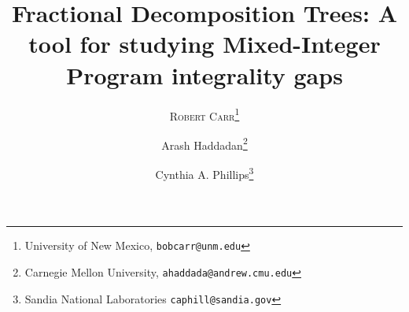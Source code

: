 \documentclass[11pt]{article}
\theoremstyle{plain}
\theoremstyle{definition}
\theoremstyle{claim}
\theoremstyle{remark}
\theoremstyle{remark}
\theoremstyle{remark}
\begin{document}
\title{Fractional Decomposition Trees: A tool for
	studying Mixed-Integer Program integrality gaps}

\author{\textsc{Robert Carr\thanks{University of New Mexico, {\tt{bobcarr@unm.edu}}}} \and Arash Haddadan\thanks{Carnegie Mellon University, {\tt{ahaddada@andrew.cmu.edu}}} \and Cynthia A. Phillips\thanks{Sandia National Laboratories {\tt{caphill@sandia.gov}}  }} \maketitle 

\begin{abstract}

\end{abstract}
\nocite{schrijver}





\nocite{fj}\nocite{32gap}\nocite{TSPcompute}\nocite{abe}


\end{document}

